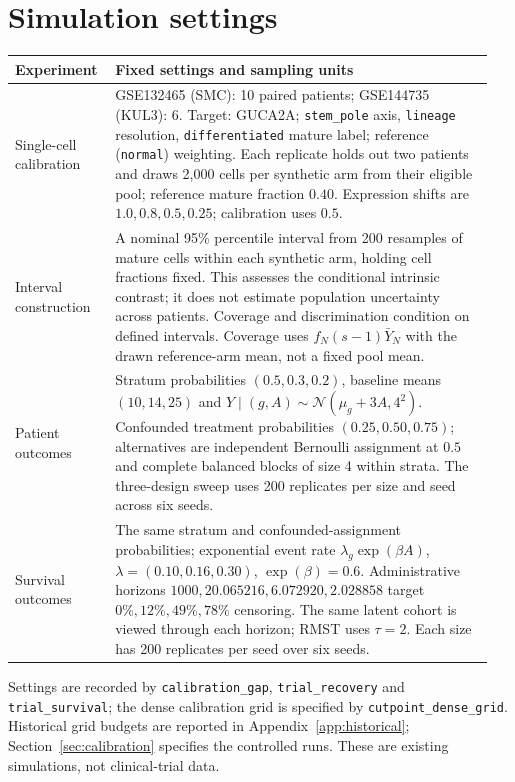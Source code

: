 \section{Simulation settings}
\label{app:methods}
\begin{center}
\small
\begin{tabular}{@{}p{0.19\linewidth}p{0.76\linewidth}@{}}
\toprule
\textbf{Experiment} & \textbf{Fixed settings and sampling units} \\
\midrule
Single-cell calibration &
GSE132465 (SMC): 10 paired patients; GSE144735 (KUL3): 6.
Target: GUCA2A; \texttt{stem\_pole} axis, \texttt{lineage} resolution,
\texttt{differentiated} mature label; reference (\texttt{normal}) weighting.
Each replicate holds out two patients and draws 2{,}000 cells per synthetic
arm from their eligible pool; reference mature fraction $0.40$.
Expression shifts are $1.0,0.8,0.5,0.25$; calibration uses $0.5$. \\
Interval construction &
A nominal 95\% percentile interval from 200 resamples of mature cells
within each synthetic arm, holding cell fractions fixed. This assesses the
conditional intrinsic contrast; it does not estimate population uncertainty
across patients. Coverage and discrimination condition on defined intervals. Coverage uses
$f_N(s-1)\bar Y_N$ with the drawn reference-arm mean, not a fixed pool mean. \\
Patient outcomes &
Stratum probabilities $(0.5,0.3,0.2)$, baseline means $(10,14,25)$ and
$Y\mid(g,A)\sim\mathcal N(\mu_g+3A,4^2)$.
Confounded treatment probabilities $(0.25,0.50,0.75)$; alternatives are
independent Bernoulli assignment at $0.5$ and complete balanced blocks of size 4
within strata. The three-design sweep uses 200 replicates per size and seed
across six seeds. \\
Survival outcomes &
The same stratum and confounded-assignment probabilities; exponential event
rate $\lambda_g\exp(\beta A)$, $\lambda=(0.10,0.16,0.30)$, $\exp(\beta)=0.6$.
Administrative horizons $1000,20.065216,6.072920,2.028858$ target
$0\%,12\%,49\%,78\%$ censoring. The same latent cohort is viewed through
each horizon; RMST uses $\tau=2$. Each size has 200 replicates per seed over
six seeds. \\
\bottomrule
\end{tabular}
\end{center}
Settings are recorded by \texttt{calibration\_gap}, \texttt{trial\_recovery}
and \texttt{trial\_survival}; the dense calibration grid is specified by
\texttt{cutpoint\_dense\_grid}. Historical grid budgets are reported in
Appendix~\ref{app:historical}; Section~\ref{sec:calibration} specifies the
controlled runs. These are existing simulations, not clinical-trial data.

